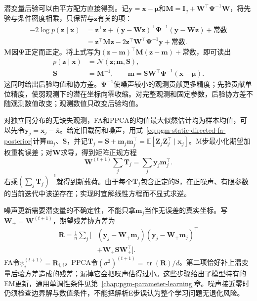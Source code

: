 潜变量后验可以由平方配方直接得到。记$\bm{y}=\bm{x}-\bm{\mu}$和$\bm{M}=\bm{I}_q+\bm{W}^{\top}\bm{\Psi}^{-1}\bm{W}$，将先验与条件密度相乘，只保留与$\bm{z}$有关的项：
\[
  \begin{aligned}
    -2\log p(\bm{z}\mid\bm{x})
      &=\bm{z}^{\top}\bm{z}
       +(\bm{y}-\bm{W}\bm{z})^{\top}
          \bm{\Psi}^{-1}(\bm{y}-\bm{W}\bm{z})
       +\text{常数}\\
      &=\bm{z}^{\top}\bm{M}\bm{z}
       -2\bm{z}^{\top}\bm{W}^{\top}\bm{\Psi}^{-1}\bm{y}
       +\text{常数}.
  \end{aligned}
\]
$\bm{M}$因$\bm{\Psi}$正定而正定。将上式写为$(\bm{z}-\bm{m})^{\top}\bm{M}(\bm{z}-\bm{m})+\text{常数}$，即可读出
\begin{equation}
  \label{eq:pgm-static-directed-fa-posterior}
  \begin{aligned}
    p(\bm{z}\mid\bm{x})&=\mathcal{N}(\bm{z};\bm{m},\bm{S}),\\
    \bm{S}&=\bm{M}^{-1},\qquad
    \bm{m}=\bm{S}\bm{W}^{\top}\bm{\Psi}^{-1}
                  (\bm{x}-\bm{\mu}).
  \end{aligned}
\end{equation}
这同时给出后验均值和协方差。$\bm{\Psi}^{-1}$使噪声较小的观测贡献更多精度；先验贡献单位精度，使弱观测下的潜在坐标向零收缩。对完整观测和固定参数，后验协方差不随观测数值改变；观测数值只改变后验均值。

对独立同分布的无缺失观测，FA和PPCA的均值最大似然估计均为样本均值，可以先令$\bm{y}_j=\bm{x}_j-\overline{\bm{x}}$。给定旧载荷和噪声，用式~\eqref{eq:pgm-static-directed-fa-posterior}计算$\bm{m}_j$、$\bm{S}$，并记$\bm{T}_j=\bm{S}+\bm{m}_j\bm{m}_j^\top=\mathbb{E}[\bm{Z}_j\bm{Z}_j^\top\mid\bm{x}_j]$。M步最小化期望加权重构误差；对$\bm{W}$求导，得到矩阵正规方程
\[
  \bm{W}^{(t+1)}\sum_j\bm{T}_j
     =\sum_j\bm{y}_j\bm{m}_j^\top.
\]
右乘$\left(\sum_j\bm{T}_j\right)^{-1}$就得到新载荷。由于每个$\bm{T}_j$包含正定的$\bm{S}$，在正噪声、有限参数的当前迭代中该逆存在；实现时宜解线性方程而不显式求逆。

噪声更新需要潜变量的不确定性，不能只拿$\bm{m}_j$当作无误差的真实坐标。写$\bm{W}_{+}=\bm{W}^{(t+1)}$，期望残差协方差为
\begin{equation}
  \label{eq:pgm-static-directed-fa-residual}
  \begin{aligned}
    \bm{R}=\frac1n\sum_j\bigl[
      &(\bm{y}_j-\bm{W}_{+}\bm{m}_j)
       (\bm{y}_j-\bm{W}_{+}\bm{m}_j)^\top\\
      &+\bm{W}_{+}\bm{S}\bm{W}_{+}^\top
    \bigr].
  \end{aligned}
\end{equation}
FA令$\psi_i^{(t+1)}=\bm{R}_{i,i}$，PPCA令$(\sigma^2)^{(t+1)}=\operatorname{tr}(\bm{R})/d$。第二项恰好补上潜变量后验方差造成的残差；漏掉它会把噪声估得过小。这些步骤给出了模型特有的EM更新，通用单调性条件见第~\ref{chap:pgm-parameter-learning}章。噪声接近零时仍须检查边界解与数值条件，不能把解析E步误认为整个学习问题无退化风险。

